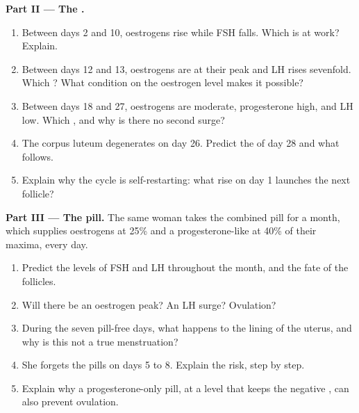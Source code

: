 \begin{problem}
\medskip
\noindent\textbf{Part II --- The .}
\begin{enumerate}[resume]
  \item Between days 2 and 10, oestrogens rise while FSH falls.
        Which  is at work? Explain.
  \item Between days 12 and 13, oestrogens are at their peak and LH
        rises sevenfold. Which ? What condition on the
        oestrogen level makes it possible?
  \item Between days 18 and 27, oestrogens are moderate, progesterone
        high, and LH low. Which , and why is there no second
        surge?
  \item The corpus luteum degenerates on day 26. Predict the 
        of day 28 and what follows.
  \item Explain why the cycle is self-restarting: what rise on day 1
        launches the next follicle?
\end{enumerate}

\medskip
\noindent\textbf{Part III --- The pill.}
The same woman takes the combined pill for a month, which supplies
oestrogens at 25\% and a progesterone-like  at 40\% of their
maxima, every day.
\begin{enumerate}[resume]
  \item Predict the levels of FSH and LH throughout the month, and
        the fate of the follicles.
  \item Will there be an oestrogen peak? An LH surge? Ovulation?
  \item During the seven pill-free days, what happens to the lining
        of the uterus, and why is this not a true menstruation?
  \item She forgets the pills on days 5 to 8. Explain the risk, step
        by step.
  \item Explain why a progesterone-only pill, at a level that keeps
        the negative , can also prevent ovulation.
\end{enumerate}


\end{problem}
